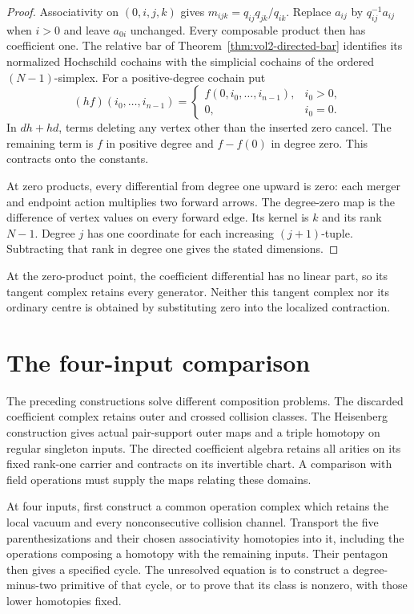 \begin{proof}
Associativity on $(0,i,j,k)$ gives
$m_{ijk}=q_{ij}q_{jk}/q_{ik}$. Replace $a_{ij}$ by
$q_{ij}^{-1}a_{ij}$ when $i>0$ and leave $a_{0i}$ unchanged.
Every composable product then has coefficient one.
The relative bar of Theorem~\ref{thm:vol2-directed-bar}
identifies its normalized Hochschild cochains with the
simplicial cochains of the ordered $(N-1)$-simplex.
For a positive-degree cochain put
\[
 (hf)(i_0,\ldots,i_{n-1})=
 \begin{cases}
 f(0,i_0,\ldots,i_{n-1}),&i_0>0,\\
 0,&i_0=0.
 \end{cases}
\]
In $dh+hd$, terms deleting any vertex other than the
inserted zero cancel. The remaining term is $f$ in positive
degree and $f-f(0)$ in degree zero. This contracts onto
the constants.

At zero products, every differential from degree one
upward is zero: each merger and endpoint action multiplies
two forward arrows. The degree-zero map is the difference
of vertex values on every forward edge. Its kernel is
$k$ and its rank $N-1$. Degree $j$ has one coordinate for
each increasing $(j+1)$-tuple. Subtracting that rank in
degree one gives the stated dimensions.
\end{proof}

At the zero-product point, the coefficient differential
has no linear part, so its tangent complex retains every
generator. Neither this tangent complex nor its ordinary
centre is obtained by substituting zero into the localized
contraction.

\section{The four-input comparison}
\label{sec:vol2-four-input-comparison}

The preceding constructions solve different composition
problems. The discarded coefficient complex retains outer
and crossed collision classes. The Heisenberg construction
gives actual pair-support outer maps and a triple homotopy
on regular singleton inputs. The directed coefficient
algebra retains all arities on its fixed rank-one carrier
and contracts on its invertible chart. A comparison with
field operations must supply the maps relating these
domains.

At four inputs, first construct a common operation complex
which retains the local vacuum and every nonconsecutive
collision channel. Transport the five parenthesizations
and their chosen associativity homotopies into it, including
the operations composing a homotopy with the remaining
inputs. Their pentagon then gives a specified cycle.
The unresolved equation is to construct a degree-minus-two
primitive of that cycle, or to prove that its class is
nonzero, with those lower homotopies fixed.


